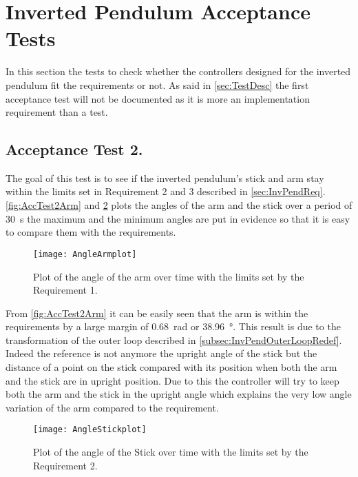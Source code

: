 \graphicspath{{figures/AcceptanceTest/}}

\section{Inverted Pendulum Acceptance Tests}\label{sec:InvPendAccTest}

In this section the tests to check whether the controllers designed for the inverted pendulum fit the requirements or not. As said in \autoref{sec:TestDesc} the first acceptance test will not be documented as it is more an implementation requirement than a test.

\subsection{Acceptance Test 2.}

The goal of this test is to see if the inverted pendulum's stick and arm stay within the limits set in Requirement 2 and 3 described in \autoref{sec:InvPendReq}. \autoref{fig:AccTest2Arm} and \ref{fig:AccTest2Stick} plots the angles of the arm and the stick over a period of \SI{30}{\second} the maximum and the minimum angles are put in evidence so that it is easy to compare them with the requirements.

\begin{figure} [htbp]
	\centering
	\texttt{[image: AngleArmplot]}
	\caption{Plot of the angle of the arm over time with the limits set by the Requirement 1.}
	\label{fig:AccTest2Arm}
\end{figure}

From \autoref{fig:AccTest2Arm} it can be easily seen that the arm is within the requirements by a large margin of \SI{0.68}{\radian} or \SI{38.96}{\degree}. This result is due to the transformation of the outer loop described in \autoref{subsec:InvPendOuterLoopRedef}. Indeed the reference is not anymore the upright angle of the stick but the distance of a point on the stick compared with its position when both the arm and the stick are in upright position. Due to this the controller will try to keep both the arm and the stick in the upright angle which explains the very low angle variation of the arm compared to the requirement.

\begin{figure} [htbp]
	\centering
	\texttt{[image: AngleStickplot]}
	\caption{Plot of the angle of the Stick over time with the limits set by the Requirement 2.}
	\label{fig:AccTest2Stick}
\end{figure}

